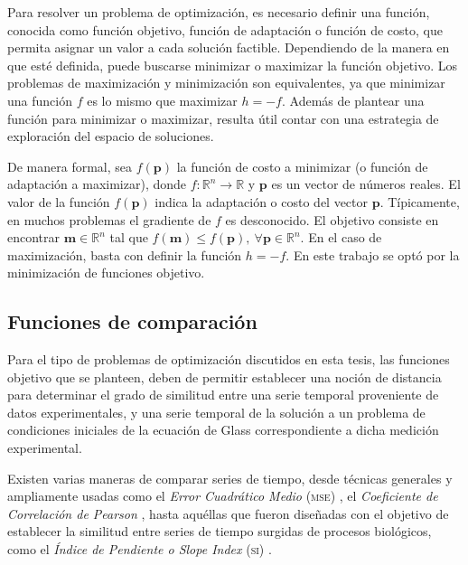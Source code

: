 Para resolver un problema de optimización, es necesario definir una función, conocida como función objetivo, función de adaptación o función de costo, que permita asignar un valor a cada solución factible. Dependiendo de la manera en que esté definida, puede buscarse minimizar o maximizar la función objetivo. Los problemas de maximización y minimización son equivalentes, ya que minimizar una función $f$ es lo mismo que maximizar $h=-f$. Además de plantear una función para minimizar o maximizar, resulta útil contar con una estrategia de exploración del espacio de soluciones. 

De manera formal, sea $f(\mathbf{p})$ la función de costo a minimizar (o función de adaptación a maximizar), donde $f:\mathbb{R}^n\rightarrow \mathbb{R}$ y $\mathbf{p}$ es un vector de números reales. El valor de la función $f(\mathbf{p})$ indica la adaptación o costo del vector $\mathbf{p}$. Típicamente, en muchos problemas el gradiente de $f$ es desconocido. El objetivo consiste en encontrar $\mathbf{m} \in \mathbb{R}^n$ tal que $f(\mathbf{m}) \le f(\mathbf{p}),\ \forall \mathbf{p} \in \mathbb{R}^n$. En el caso de maximización, basta con definir la función $h=-f$. En este trabajo se optó por la minimización de funciones objetivo.

\subsection{Funciones de comparación}

Para el tipo de problemas de optimización discutidos en esta tesis, las funciones objetivo que se planteen, deben de permitir establecer una noción de distancia para determinar el grado de similitud entre una serie temporal proveniente de datos experimentales, y una serie temporal de la solución a un problema de condiciones iniciales de la ecuación de Glass correspondiente a dicha medición experimental.

Existen varias maneras de comparar series de tiempo, desde técnicas generales y ampliamente usadas como el \emph{Error Cuadrático Medio} \textsc{(mse)} \citep{msewiki}, el \emph{Coeficiente de Correlación de Pearson} \citep{pearsoncorrwiki}, hasta aquéllas que fueron diseñadas con el objetivo de establecer la similitud entre series de tiempo surgidas de procesos biológicos, como el \emph{Índice de Pendiente o Slope Index} \textsc{(si)} \citeauthor{Cho2006} \citep{Cho2006}.%

